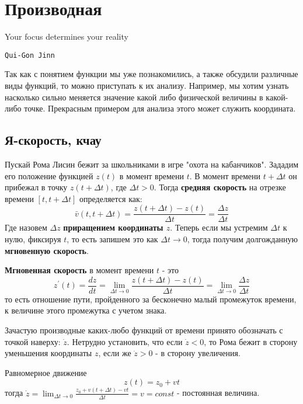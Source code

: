 \section{Производная}
\epigraph{\textsf{Your focus determines your reality}}{\texttt{Qui-Gon Jinn}}
Так как с понятием функции мы уже познакомились, а также обсудили различные виды функций, то можно приступать к их анализу. Например, мы хотим узнать насколько сильно меняется значение какой либо физической величины в какой-либо точке. Прекрасным примером для анализа этого может служить координата.
\subsection{Я-скорость, кчау}
Пускай Рома Лисин бежит за школьниками в игре "охота на кабанчиков". Зададим его положение функцией $z(t)$ в момент времени $t$. В момент времени $t + \Delta t$ он прибежал в точку $z(t + \Delta t)$, где $\Delta t > 0$.
Тогда \textbf{средняя скорость} на отрезке времени $[t, t + \Delta t]$ определяется как:
\begin{equation*}
    \bar{v} (t, t + \Delta t) = \frac{z(t + \Delta t) - z(t)}{\Delta t} = \frac{\Delta z}{\Delta t}
\end{equation*}
Где назовем $\Delta z$ \textbf{приращением координаты $z$}. Теперь если мы устремим $\Delta t$ к нулю, фиксируя $t$, то есть запишем это как $\Delta t \rightarrow 0$, тогда получим долгожданную \textbf{мгновенную скорость}.
\begin{definition}
    \textbf{Мгновенная скорость} в момент времени $t$ - это 
    \begin{equation*}
        z^{'}(t) = \frac{dz}{dt} = \lim_{\Delta t \rightarrow 0} \frac{z(t + \Delta t) - z(t)}{\Delta t} = \lim_{\Delta t \rightarrow 0} \frac{\Delta z}{\Delta t}
    \end{equation*}
    то есть отношение пути, пройденного за бесконечно малый промежуток времени, к величине этого промежутка с учетом знака.
\end{definition}
Зачастую производные каких-любо функций от времени принято обозначать с точкой наверху: $\dot{z}$. Нетрудно установить, что если $\dot{z} < 0$, то Рома бежит в сторону уменьшения координаты $z$, если же $\dot z > 0$ - в сторону увеличения.

\begin{example}
    Равномерное движение
    \begin{equation*}
        z(t) = z_0 + vt
    \end{equation*}
    тогда $\displaystyle\dot{z} = \lim_{\Delta t \rightarrow 0} \frac{z_0 + v(t + \Delta t) - vt}{\Delta t} = v = const$ - постоянная величина.
\end{example}

